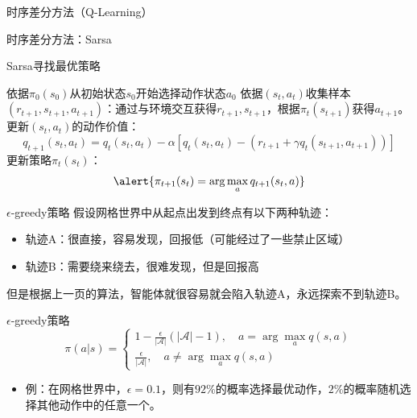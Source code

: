\begin{section}{时序差分方法\alert{（Q-Learning）}}
\begin{frame}{时序差分方法：Sarsa}
    \vspace{-0.2cm}
    \begin{block}{Sarsa寻找最优策略}
        \begin{algorithmic}[1]
                \State 依据$\pi_0(s_0)$从初始状态$s_0$开始选择动作状态$a_0$
                    \State 依据$(s_t,a_t)$收集样本$(r_{t+1},s_{t+1},a_{t+1})$：通过与环境交互获得$r_{t+1},s_{t+1}$，根据$\pi_t(s_{t+1})$获得$a_{t+1}$。
                    \State 更新$(s_t, a_t)$的动作价值：
                    \[
                        q_{t+1}(s_t,a_t)=q_t(s_t,a_t)-\alpha[q_t(s_t,a_t)-(r_{t+1}+\gamma q_t(s_{t+1},a_{t+1}))]
                    \]
                    \State \alert{更新策略$\pi_t(s_t)$}：
                    \[
                        \alert{\pi_{t+1}(s_t)=\arg\max_a q_{t+1}(s_t,a)}
                    \]
                \EndIf
            \EndFor
        \end{algorithmic}
    \end{block}
\end{frame}

\begin{frame}{$\epsilon$-greedy策略}
    假设网格世界中从起点出发到终点有以下两种轨迹：
    \begin{itemize}
        \item 轨迹A：很直接，容易发现，回报低（可能经过了一些禁止区域）
        \item 轨迹B：需要绕来绕去，很难发现，但是回报高
    \end{itemize}
    但是根据上一页的算法，智能体就很容易就会陷入轨迹A，永远探索不到轨迹B。
    \begin{block}{$\epsilon$-greedy策略}
        \[
            \pi(a|s)=\begin{cases}
                1-\frac{\epsilon}{|\mathcal{A}|}(|\mathcal{A}|-1),\quad a=\arg\max_{a}q(s,a) \\
                \frac{\epsilon}{|\mathcal{A}|},\quad a \neq \arg\max_{a}q(s,a)
            \end{cases}
        \]
    \end{block}
    \begin{itemize}
        \item 例：在网格世界中，$\epsilon=0.1$，则有$92\%$的概率选择最优动作，$2\%$的概率随机选择其他动作中的任意一个。
    \end{itemize}
\end{frame}


\end{section}
